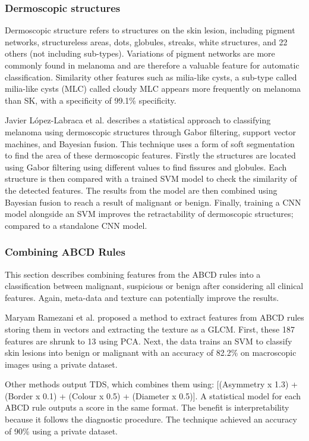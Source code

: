 \subsubsection{Dermoscopic structures}
Dermoscopic structure refers to structures on the skin lesion, including pigment networks, structureless areas, dots, globules, streaks, white structures, and 22 others (not including sub-types). Variations of pigment networks are more commonly found in melanoma\cite{Anantha04} and are therefore a valuable feature for automatic classification. Similarity other features such as milia-like cysts, a sub-type called milia-like cysts (MLC) called cloudy MLC appears more frequently on melanoma than SK, with a specificity of  99.1\% specificity\cite{Stricklin2011}.

Javier López-Labraca et al.\cite{Lopez-Labraca2018} describes a statistical approach to classifying melanoma using dermoscopic structures through Gabor filtering, support vector machines, and Bayesian fusion. This technique uses a form of soft segmentation to find the area of these dermoscopic features. Firstly the structures are located using Gabor filtering using different values to find fissures and globules. Each structure is then compared with a trained SVM model to check the similarity of the detected features. The results from the model are then combined using Bayesian fusion to reach a result of malignant or benign. Finally, training a CNN model alongside an SVM improves the retractability of dermoscopic structures; compared to a standalone CNN model.

\subsubsection{Combining ABCD Rules}
This section describes combining features from the ABCD rules into a classification between malignant, suspicious or benign after considering all clinical features. Again, meta-data and texture can potentially improve the results.

Maryam Ramezani et al. proposed a method to extract features from ABCD rules storing them in vectors and extracting the texture as a GLCM. First, these 187 features are shrunk to 13 using PCA\cite{Ramezani2014}. Next, the data trains an SVM to classify skin lesions into benign or malignant with an accuracy of 82.2\% on macroscopic images using a private dataset.

Other methods output TDS\cite{Zaqout2016, Zhang2018}, which combines them using: [(Asymmetry x 1.3) + (Border x 0.1) + (Colour x 0.5) + (Diameter x 0.5)]. A statistical model for each ABCD rule outputs a score in the same format. The benefit is interpretability because it follows the diagnostic procedure. The technique achieved an accuracy of 90\% using a private dataset.

